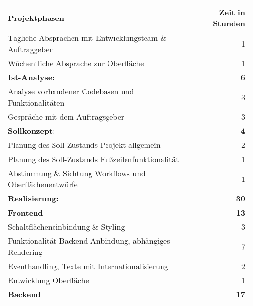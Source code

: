 \begin{center}
	\begin{tabular}{|l|r|}
		\hline
		\rowcolor{blue!70}\textbf{Projektphasen }                                  & \textbf{Zeit in Stunden} \\ \hline
		\rowcolor{blue!10}Tägliche Absprachen mit Entwicklungsteam \& Auftraggeber &                        1 \\
		\rowcolor{blue!10}Wöchentliche Absprache zur Oberfläche                    &                        1 \\
		\rowcolor{blue!50}\textbf{Ist-Analyse: }                                   &               \textbf{6} \\
		\rowcolor{blue!10}Analyse vorhandener Codebasen und Funktionalitäten       &                        3 \\
		\rowcolor{blue!10}Gespräche mit dem Auftragsgeber                          &                        3 \\
		\rowcolor{blue!50}\textbf{Sollkonzept:  }                                  &               \textbf{4} \\
		\rowcolor{blue!10}Planung des Soll-Zustands Projekt allgemein              &                        2 \\
		\rowcolor{blue!10}Planung des Soll-Zustands Fußzeilenfunktionalität        &                        1 \\
		\rowcolor{blue!10}Abstimmung \& Sichtung Workflows und Oberflächenentwürfe &                        1 \\
		\rowcolor{blue!50}\textbf{Realisierung: }                                  &              \textbf{30} \\
		\rowcolor{blue!30}\textbf{Frontend  }                                      &              \textbf{13} \\
		\rowcolor{blue!10}Schaltflächeneinbindung \& Styling                     &                        3 \\
		\rowcolor{blue!10}Funktionalität Backend Anbindung, abhängiges Rendering   &                        7 \\
		\rowcolor{blue!10}Eventhandling, Texte mit Internationalisierung           &                        2 \\
		\rowcolor{blue!10}Entwicklung Oberfläche                                   &                        1 \\
		\rowcolor{blue!30}\textbf{Backend  }                                       &             \textbf{ 17} \\

\end{tabular}
\end{center}
